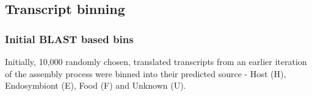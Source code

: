 \subsection{Transcript binning}

\subsubsection{Initial BLAST based bins}

Initially, 10,000 randomly chosen, translated transcripts from an earlier iteration
of the assembly process were binned into their predicted source - 
Host (H), Endosymbiont (E), Food (F) and Unknown (U).  


